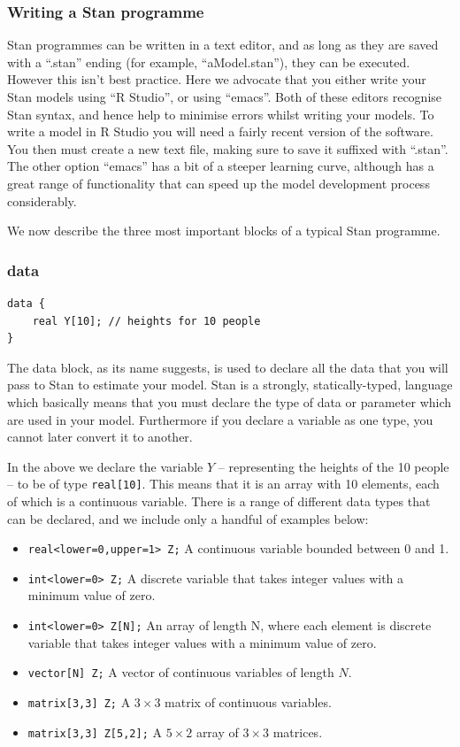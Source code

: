 \documentclass[11pt,fullpage]{book}
\begin{document}
\subsubsection{Writing a Stan programme}
Stan programmes can be written in a text editor, and as long as they are saved with a ``.stan'' ending (for example, ``aModel.stan''), they can be executed. However this isn't best practice. Here we advocate that you either write your Stan models using ``R Studio'', or using ``emacs''. Both of these editors recognise Stan syntax, and hence help to minimise errors whilst writing your models. To write a model in R Studio you will need a fairly recent version of the software. You then must create a new text file, making sure to save it suffixed with ``.stan''. The other option ``emacs'' has a bit of a steeper learning curve, although has a great range of functionality that can speed up the model development process considerably.

We now describe the three most important blocks of a typical Stan programme.

\subsubsection{data}
\begin{verbatim}
data {
    real Y[10]; // heights for 10 people
}
\end{verbatim}

The data block, as its name suggests, is used to declare all the data that you will pass to Stan to estimate your model. Stan is a strongly, statically-typed, language which basically means that you must declare the type of data or parameter which are used in your model. Furthermore if you declare a variable as one type, you cannot later convert it to another. 

In the above we declare the variable $Y$ -- representing the heights of the 10 people -- to be of type \texttt{real[10]}. This means that it is an array with 10 elements, each of which is a continuous variable. There is a range of different data types that can be declared, and we include only a handful of examples below:

\begin{itemize}
\item \texttt{real<lower=0,upper=1> Z;} A continuous variable bounded between 0 and 1.
\item \texttt{int<lower=0> Z;} A discrete variable that takes integer values with a minimum value of zero.
\item \texttt{int<lower=0> Z[N];} An array of length N, where each element is discrete variable that takes integer values with a minimum value of zero.
\item \texttt{vector[N] Z;} A vector of continuous variables of length $N$.
\item \texttt{matrix[3,3] Z;} A $3\times3$ matrix of continuous variables.
\item \texttt{matrix[3,3] Z[5,2];} A $5\times 2$ array of $3\times3$ matrices.
\end{itemize}
\end{document}
